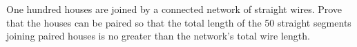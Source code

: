 One hundred houses are joined by a connected network of straight wires. Prove that the houses can be paired so that the total length of the 50 straight segments joining paired houses is no greater than the network's total wire length.
